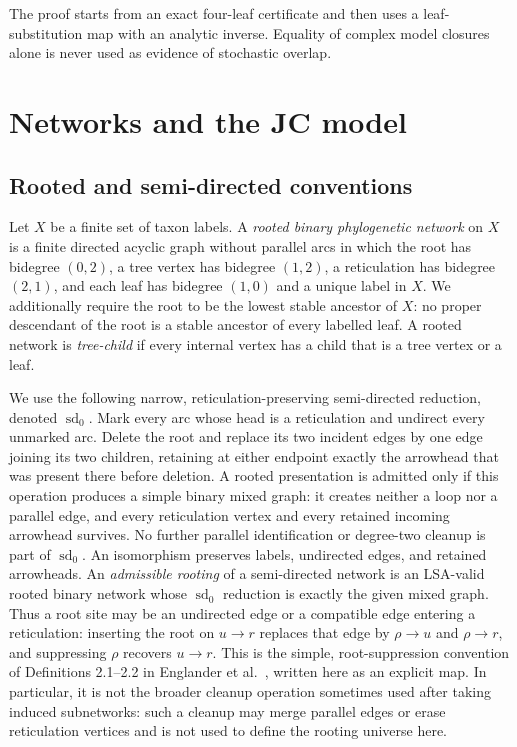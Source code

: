 \documentclass[11pt]{article}
\theoremstyle{remark}
\begin{document}
The proof starts from an exact four-leaf certificate and then uses a
leaf-substitution map with an analytic inverse.  Equality of complex model
closures alone is never used as evidence of stochastic overlap.

\section{Networks and the JC model}

\subsection{Rooted and semi-directed conventions}

Let $X$ be a finite set of taxon labels.  A \emph{rooted binary
phylogenetic network} on $X$ is a finite directed acyclic graph without
parallel arcs in which the root has bidegree $(0,2)$, a tree vertex has
bidegree $(1,2)$, a reticulation has bidegree $(2,1)$, and each leaf has
bidegree $(1,0)$ and a unique label in $X$.  We additionally require the
root to be the lowest stable ancestor of $X$: no proper descendant of the
root is a stable ancestor of every labelled leaf.  A rooted network is
\emph{tree-child} if every internal vertex has a child that is a tree vertex
or a leaf.

We use the following narrow, reticulation-preserving semi-directed reduction,
denoted $\operatorname{sd}_0$.  Mark every arc whose head is a
reticulation and undirect every unmarked arc.  Delete the root and replace its
two incident edges by one edge joining its two children, retaining at either
endpoint exactly the arrowhead that was present there before deletion.  A
rooted presentation is admitted only if this operation produces a simple
binary mixed graph: it creates neither a loop nor a parallel edge, and every
reticulation vertex and every retained incoming arrowhead survives.  No
further parallel identification or degree-two cleanup is part of
$\operatorname{sd}_0$.  An isomorphism preserves labels, undirected edges,
and retained arrowheads.  An \emph{admissible rooting} of a semi-directed
network is an LSA-valid rooted binary network whose $\operatorname{sd}_0$
reduction is exactly the given mixed graph.
Thus a root site may be an undirected edge or a compatible edge entering a
reticulation: inserting the root on $u\to r$ replaces that edge by
$\rho\to u$ and $\rho\to r$, and suppressing $\rho$ recovers $u\to r$.
This is the simple, root-suppression convention of Definitions 2.1--2.2 in
Englander et al.~\cite{EnglanderEtAl2026}, written here as an explicit map.
In particular, it is not the broader cleanup operation sometimes used after
taking induced subnetworks: such a cleanup may merge parallel edges or erase
reticulation vertices and is not used to define the rooting universe here.
\end{document}
